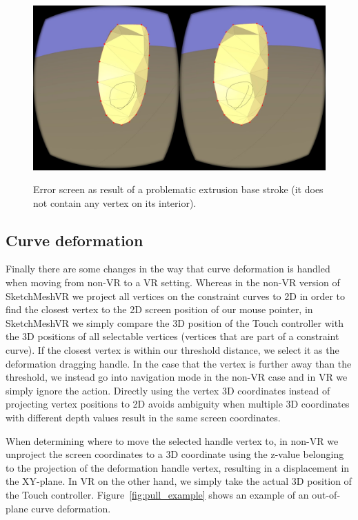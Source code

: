 \begin{figure}[!h]
    \centering
    \includegraphics[width=0.7260\linewidth]{figures/error_extrusion}\\
    \caption[Error screen as result of a problematic extrusion]{Error screen as result of a problematic extrusion base stroke (it does not contain any vertex on its interior).
      \label{fig:errordisplay}}
\end{figure}

\subsection{Curve deformation}
Finally there are some changes in the way that curve deformation is handled when moving from non-VR to a VR setting. Whereas in the non-VR version of SketchMeshVR we project all vertices on the constraint curves to 2D in order to find the closest vertex to the 2D screen position of our mouse pointer, in SketchMeshVR we simply compare the 3D position of the Touch controller with the 3D positions of all selectable vertices (vertices that are part of a constraint curve). If the closest vertex is within our threshold distance, we select it as the deformation dragging handle. In the case that the vertex is further away than the threshold, we instead go into navigation mode in the non-VR case and in VR we simply ignore the action. Directly using the vertex 3D coordinates instead of projecting vertex positions to 2D avoids ambiguity when multiple 3D coordinates with different depth values result in the same screen coordinates. 

When determining where to move the selected handle vertex to, in non-VR we unproject the screen coordinates to a 3D coordinate using the z-value belonging to the projection of the deformation handle vertex, resulting in a displacement in the XY-plane. In VR on the other hand, we simply take the actual 3D position of the Touch controller. Figure~\ref{fig:pull_example} shows an example of an out-of-plane curve deformation.


